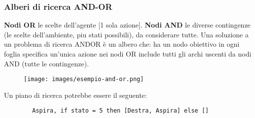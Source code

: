 \subsubsection{Alberi di ricerca AND-OR}
\textbf{Nodi OR} le scelte dell’agente [1 sola azione]. \textbf{Nodi AND} le diverse contingenze (le scelte dell'ambiente, piu stati possibili), da considerare tutte.
Una soluzione a un problema di ricerca ANDOR è un albero che: ha un nodo obiettivo in ogni foglia specifica un’unica azione nei nodi OR include tutti gli archi uscenti da nodi AND (tutte le contingenze).
\begin{example}
    \begin{figure}[h!]
        \centering
        \texttt{[image: images/esempio-and-or.png]}
    \end{figure}
    Un piano di ricerca potrebbe essere il seguente:
    \begin{lstlisting}
        Aspira, if stato = 5 then [Destra, Aspira] else []
    \end{lstlisting}
\end{example}